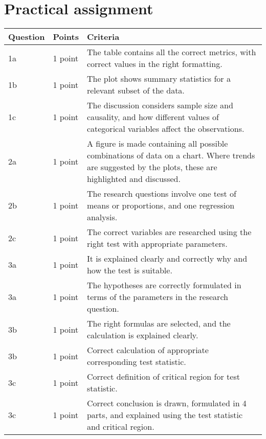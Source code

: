 
\section{Practical assignment}

\selectfont 

\begin{center}
\small
\begin{tabularx}{\textwidth}{l|l|>{\raggedright\arraybackslash}X}
    \textbf{Question} & \textbf{Points} & \textbf{Criteria} \\
    \hline
     1a & 1 point & The table contains all the correct metrics, with correct values in the right formatting. \\
     1b & 1 point & The plot shows summary statistics for a relevant subset of the data. \\
     1c & 1 point & The discussion considers sample size and causality, and how different values of categorical variables affect the observations. \\
     2a & 1 point & A figure is made containing all possible combinations of data on a chart. Where trends are suggested by the plots, these are highlighted and discussed. \\
     2b & 1 point & The research questions involve one test of means or proportions, and one regression analysis. \\
     2c & 1 point & The correct variables are researched using the right test with appropriate parameters. \\
     3a & 1 point & It is explained clearly and correctly why and how the test is suitable. \\
     3a & 1 point & The hypotheses are correctly formulated in terms of the parameters in the research question. \\
     3b & 1 point & The right formulas are selected, and the calculation is explained clearly. \\
     3b & 1 point & Correct calculation of appropriate corresponding test statistic. \\
     3c & 1 point & Correct definition of critical region for test statistic. \\
     3c & 1 point & Correct conclusion is drawn, formulated in 4 parts, and explained using the test statistic and critical region. \\

\end{tabularx}
\end{center}
